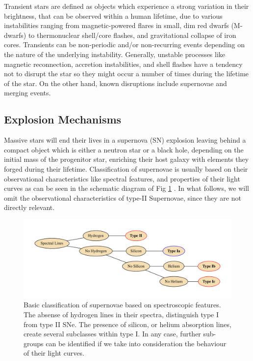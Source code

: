 \documentclass[../../main/thesis_msc.tex]{subfiles}
\begin{document}
		
		Transient stars are defined as objects which experience a strong variation in their brightness, that can be observed within a human lifetime, due to various instabilities ranging from magnetic-powered flares in small, dim red dwarfs (M-dwarfs) to thermonuclear shell/core flashes, and gravitational collapse of iron cores. Transients can be non-periodic and/or non-recurring events depending on the nature of the underlying instability. Generally, unstable processes like magnetic reconnection, accretion instabilities, and shell flashes have a tendency not to disrupt the star so they might occur a number of times during the lifetime of the star. On the other hand, known disruptions include supernovae and merging events. 
		
			\subsection{Explosion Mechanisms}
			
				
				Massive stars will end their lives in a supernova (SN) explosion leaving behind a compact object which is either a neutron star or a black hole, depending on the initial mass of the progenitor star, enriching their host galaxy with elements they forged during their lifetime. Classification of supernovae is usually based on their observational characteristics like spectral features, and properties of their light curves as can be seen in the schematic diagram of Fig \ref{fig:SNe_classification} \citep[see][]{Filippenko1997, Turatto2003}. In what follows, we will omit the observational characteristics of type-II Supernovae, since they are not directly relevant. 
				
				\begin{figure}[h]
					\centering
					\includegraphics[width = \textwidth]{../figures/chapter1/SNeClass.pdf}
					\caption{Basic classification of supernovae based on spectroscopic features. The absense of hydrogen lines in their spectra, distinguish type I from type II SNe. The presence of silicon, or helium absorption lines, create several subclasses within type I. In any case, further sub-groups can be identified if we take into consideration the behaviour of their light curves.}
					\label{fig:SNe_classification}
				\end{figure}
				
\end{document}
